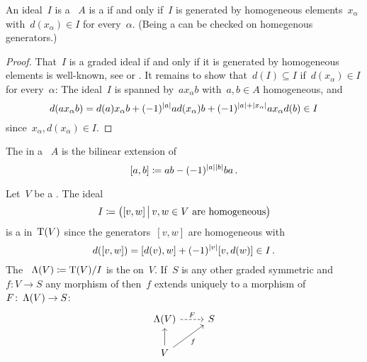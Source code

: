 \documentclass[a4paper,10pt,headings=standardclasses]{scrartcl}
\begin{document}
\begin{lemma}
  An ideal~$I$ is a {\dga}~$A$ is a {\dgi} if and only if~$I$ is generated by homogeneous elements~$x_\alpha$ with~$d(x_\alpha) \in I$ for every~$\alpha$.
  (Being a {\dgi} can be checked on homegenous generators.)
\end{lemma}

\begin{proof}
  That~$I$ is a graded ideal if and only if it is generated by homogeneous elements is  well-known, see \cite[IX, 2.5]{lang} or \cite[II.{\S}11.3]{bourbaki}.
  It remains to show that~$d(I) \subseteq I$ if~$d(x_\alpha) \in I$ for every~$\alpha$:
  The ideal~$I$ is spanned by~$a x_\alpha b$ with~$a, b \in A$ homogeneous, and
  \[
    d(a x_\alpha b)
    =
      d(a) x_\alpha b
    + (-1)^{\lvert a\rvert} a d(x_\alpha) b
    + (-1)^{\lvert a\rvert + \lvert x_\alpha\rvert} a x_\alpha d(b)
    \in
    I
  \]
  since~$x_\alpha, d(x_\alpha) \in I$.
\end{proof}

\begin{definition}
  The  in a {\dga}~$A$ is the bilinear extension of
  \[
    [a,b]
    \coloneqq
    ab - (-1)^{\lvert a\rvert\lvert b\rvert} ba \,.
  \]
\end{definition}

\begin{example}
  \label{dg symmetric algebra}
  Let~$V$ be a {\dgv}.
  The ideal
  \[
    I
    \defined
    \bigl(
      [v,w]
    \suchthat[\big]
      \text{$v,w \in V$ are homogeneous}
    \bigr)
  \]
  is a {\dgi} in~$\operatorname{T}(V)$ since the generators~$[v,w]$ are homogeneous with
  \[
    d([v,w])
    =
    [d(v), w] + (-1)^{\lvert v\rvert} [v, d(w)]
    \in
    I \,.
  \]
  The {\dga}~$\operatorname{\Lambda}(V) \coloneqq \operatorname{T}(V)/I$ is the  on~$V$.
  If~$S$ is any other graded symmetric {\dga} and~$f \colon V \to S$ any morphism of {\dgv} then~$f$ extends uniquely to a morphism of~{\dgas}~$F \colon \operatorname{\Lambda}(V) \to S$:
  \[
    \begin{tikzcd}
      \dgSymm(V)
      \arrow[dashed]{r}[above]{F}
      &
      S
      \\
      V
      \arrow{u}
      \arrow{ur}[below right]{f}
      &
      {}
    \end{tikzcd}
  \]

\end{example}
\end{document}
